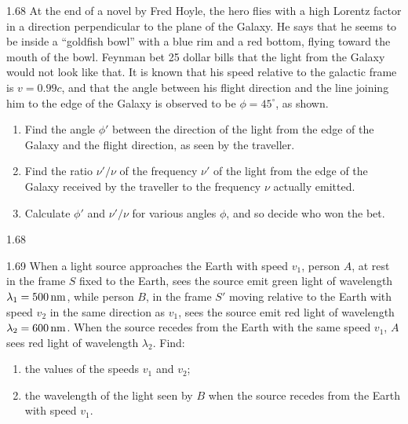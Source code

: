 \begin{problem}{1.68}
At the end of a novel by Fred Hoyle, the hero flies with a high Lorentz factor in a direction perpendicular to the plane of the Galaxy. He says that he seems to be inside a ``goldfish bowl'' with a blue rim and a red bottom, flying toward the mouth of the bowl. Feynman bet 25 dollar bills that the light from the Galaxy would not look like that. It is known that his speed relative to the galactic frame is $v=0.99c$, and that the angle between his flight direction and the line joining him to the edge of the Galaxy is observed to be $\phi=45^\circ$, as shown.
\begin{enumerate}[label=(\arabic*),leftmargin=2.2em,itemsep=1pt,topsep=2pt]
\item Find the angle $\phi'$ between the direction of the light from the edge of the Galaxy and the flight direction, as seen by the traveller.
\item Find the ratio $\nu'/\nu$ of the frequency $\nu'$ of the light from the edge of the Galaxy received by the traveller to the frequency $\nu$ actually emitted.
\item Calculate $\phi'$ and $\nu'/\nu$ for various angles $\phi$, and so decide who won the bet.
\end{enumerate}
\end{problem}

\begin{figbox}{1.68}
\end{figbox}

\begin{problem}{1.69}
When a light source approaches the Earth with speed $v_1$, person $A$, at rest in the frame $S$ fixed to the Earth, sees the source emit green light of wavelength $\lambda_1=500\,\mathrm{nm}$, while person $B$, in the frame $S'$ moving relative to the Earth with speed $v_2$ in the same direction as $v_1$, sees the source emit red light of wavelength $\lambda_2=600\,\mathrm{nm}$. When the source recedes from the Earth with the same speed $v_1$, $A$ sees red light of wavelength $\lambda_2$. Find:
\begin{enumerate}[label=(\arabic*),leftmargin=2.2em,itemsep=1pt,topsep=2pt]
\item the values of the speeds $v_1$ and $v_2$;
\item the wavelength of the light seen by $B$ when the source recedes from the Earth with speed $v_1$.
\end{enumerate}
\end{problem}

